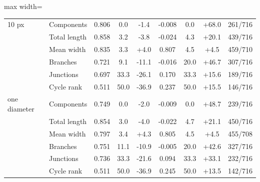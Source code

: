\begin{table}[h]
\begin{adjustbox}{max width=\linewidth}
\begin{tabular}{llccccccc}
\midrule
10 px & Components & 0.806 & 0.0 & -1.4 & -0.008 & 0.0 & +68.0 & 261/716\\
 & Total length & 0.858 & 3.2 & -3.8 & -0.024 & 4.3 & +20.1 & 439/716\\
 & Mean width & 0.835 & 3.3 & +4.0 & 0.807 & 4.5 & +4.5 & 459/710\\
 & Branches & 0.721 & 9.1 & -11.1 & -0.016 & 20.0 & +46.7 & 307/716\\
 & Junctions & 0.697 & 33.3 & -26.1 & 0.170 & 33.3 & +15.6 & 189/716\\
 & Cycle rank & 0.511 & 50.0 & -36.9 & 0.237 & 50.0 & +15.5 & 146/716\\
\midrule
one diameter & Components & 0.749 & 0.0 & -2.0 & -0.009 & 0.0 & +48.7 & 239/716\\
 & Total length & 0.854 & 3.0 & -4.0 & -0.022 & 4.7 & +21.1 & 450/716\\
 & Mean width & 0.797 & 3.4 & +4.3 & 0.805 & 4.5 & +4.5 & 455/708\\
 & Branches & 0.751 & 11.1 & -10.9 & -0.005 & 20.0 & +42.6 & 327/716\\
 & Junctions & 0.736 & 33.3 & -21.6 & 0.094 & 33.3 & +33.1 & 232/716\\
 & Cycle rank & 0.511 & 50.0 & -36.9 & 0.245 & 50.0 & +13.5 & 142/716\\
\bottomrule
\end{tabular}
\end{adjustbox}
\end{table}
